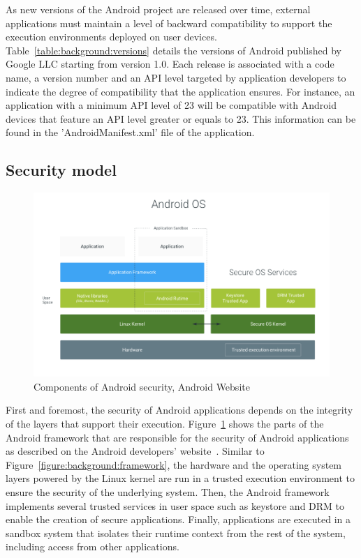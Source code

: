 

As new versions of the Android project are released over time, external applications must maintain a level of backward compatibility to support the execution environments deployed on user devices.
Table~\ref{table:background:versions} details the versions of Android published by Google LLC starting from version 1.0.
Each release is associated with a code name, a version number and an API level targeted by application developers to indicate the degree of compatibility that the application ensures.
For instance, an application with a minimum API level of 23 will be compatible with Android devices that feature an API level greater or equals to 23.
This information can be found in the 'AndroidManifest.xml' file of the application.
\subsection{Security model}

\begin{figure}[!ht]
        \centering
	\includegraphics[width=\linewidth]{figures/background/security.png}
        \caption[Components related to Android security]{Components of Android security, Android Website~\cite{android_website_android_2019}}
	\label{figure:background:security}
\end{figure}

First and foremost, the security of Android applications depends on the integrity of the layers that support their execution.
Figure~\ref{figure:background:security} shows the parts of the Android framework that are responsible for the security of Android applications as described on the Android developers' website~\cite{android_website_android_2019}.
Similar to Figure~\ref{figure:background:framework}, the hardware and the operating system layers powered by the Linux kernel are run in a trusted execution environment to ensure the security of the underlying system.
Then, the Android framework implements several trusted services in user space such as keystore and DRM to enable the creation of secure applications.
Finally, applications are executed in a sandbox system that isolates their runtime context from the rest of the system, including access from other applications.

